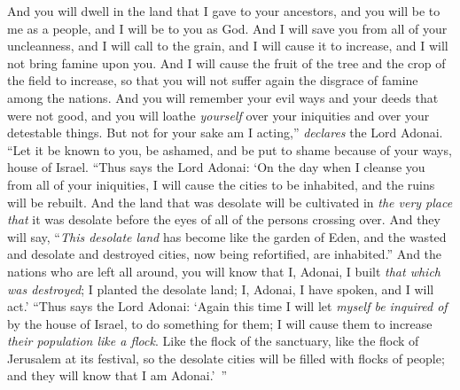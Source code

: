 \begin{biblechapter}
\verse And you will dwell in the land that I gave to your ancestors, and you will be to me as a people, and I will be to you as God.
\verse And I will save you from all of your uncleanness, and I will call to the grain, and I will cause it to increase, and I will not bring famine upon you.
\verse And I will cause the fruit of the tree and the crop of the field to increase, so that you will not suffer again the disgrace of famine among the nations.
\verse And you will remember your evil ways and your deeds that were not good, and you will loathe \textit{yourself} over your iniquities and over your detestable things.
\verse But not for your sake am I acting,” \textit{declares} the Lord Adonai. “Let it be known to you, be ashamed, and be put to shame because of your ways, house of Israel.
\verse “Thus says the Lord Adonai: ‘On the day when I cleanse you from all of your iniquities, I will cause the cities to be inhabited, and the ruins will be rebuilt.
\verse And the land that was desolate will be cultivated in \textit{the very place that} it was desolate before the eyes of all of the persons crossing over.
\verse And they will say, “\textit{This desolate land} has become like the garden of Eden, and the wasted and desolate and destroyed cities, now being refortified, are inhabited.”
\verse And the nations who are left all around, you will know that I, Adonai, I built \textit{that which was destroyed}; I planted the desolate land; I, Adonai, I have spoken, and I will act.’
\verse “Thus says the Lord Adonai: ‘Again this time I will let \textit{myself be inquired of} by the house of Israel, to do something for them; I will cause them to increase \textit{their population like a flock}.
\verse Like the flock of the sanctuary, like the flock of Jerusalem at its festival, so the desolate cities will be filled with flocks of people; and they will know that I am Adonai.’ ”
\end{biblechapter}


